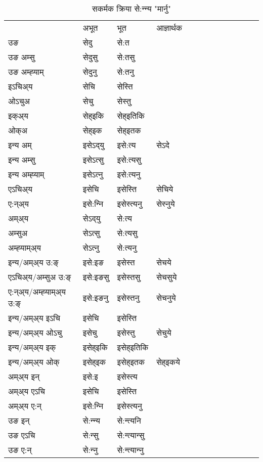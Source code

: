 \begin{table}[H]
\label{et.vt} \centering
\caption{सकर्मक क्रिया  से:न्‍न्य  "मार्नु"  }
\begin{tabular}{l|l|l|l|l|l|l|l|l|l|l|l|l}  \toprule
&अभूत & भूत & आज्ञार्थक \\ 
उङ &सेदु &से:त \\ 
उङ अम्सु &सेदुसु &से:तसु \\ 
उङ अम्ह्‍याम् &सेदुनु &से:तनु \\ 
इऽचिअ्य &सेचि &सेस्ति   \\ 
ओऽचुअ &सेचु &सेस्तु   \\ 
इक्अ्य &सेह्इकि &सेह्इतिकि   \\ 
ओक्अ &सेह्इक &सेह्इतक   \\ 
इन्य अम् & इसेऽद्‌यु  & इसे:त्य &सेऽदे  \\ 
इन्य अम्सु & इसेऽत्सु  & इसे:त्यसु   \\ 
इन्य अम्ह्‍याम् & इसेऽत्‍नु  & इसे:त्यनु   \\ 
एऽचिअ्य & इसेचि & इसेस्ति &सेचिये    \\ 
ए:न्अ्य & इसे:न्‍नि  & इसेस्त्यनु &सेस्‍नुये  \\ 
अम्अ्य & सेऽद्‌यु  & से:त्य  \\ 
अम्सुअ & सेऽत्सु & से:त्यसु  \\ 
अम्ह्‍याम्अ्य & सेऽत्‍नु  & से:त्यनु \\ 
\midrule
इन्य/अम्अ्य उ:ङ्‌&इसे:इङ & इसेस्त &सेचये \\ 
एऽचिअ्य/अम्सुअ उ:ङ्‌ &इसे:इङसु & इसेस्तसु &सेचसुये \\ 
ए:न्अ्य/अम्ह्‍याम्अ्य उ:ङ्‌ &इसे:इङनु & इसेस्तनु &सेचनुये \\ 
इन्य/अम्अ्य इऽचि & इसेचि & इसेस्ति    \\ 
इन्य/अम्अ्य ओऽचु & इसेचु & इसेस्तु  &सेचुये  \\ 
इन्य/अम्अ्य इक् & इसेह्इकि & इसेह्इतिकि   \\ 
इन्य/अम्अ्य ओक् & इसेह्इक & इसेह्इतक  &सेह्इकये  \\ 
अम्अ्य इन् & इसे:इ & इसेस्त्य   \\ 
अम्अ्य एऽचि & इसेचि & इसेस्ति    \\ 
अम्अ्य ए:न् & इसे:न्‍नि  & इसेस्त्यनु  \\ 
\midrule
उङ इन् & से:न्‍न्य  & से:न्त्यनि  \\ 
उङ एऽचि & से:न्सु  & से:न्त्यान्सु   \\ 
उङ ए:न्& से:न्‍नु  & से:न्त्यान्‍नु   \\ 
\bottomrule
\end{tabular}
\end{table}


